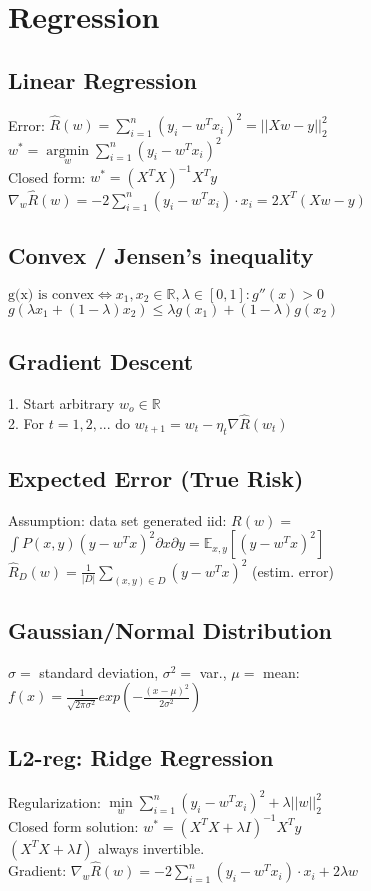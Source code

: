 \section*{Regression}
\subsection*{Linear Regression}
Error: $\hat{R}(w) = \sum_{i=1}^n (y_i - w^Tx_i)^2 = ||Xw-y||^2_2$\\
$w^* = \underset{w}{\operatorname{argmin}} \sum_{i=1}^n (y_i - w^Tx_i)^2$\\
Closed form: $w^*=(X^T X)^{-1} X^T y$\\
$\nabla_w \hat{R}(w) = -2 \sum_{i=1}^n (y_i-w^T x_i) \cdot x_i = 2X^T (Xw-y)$

\subsection*{Convex / Jensen's inequality}
$\text{g(x) is convex} \Leftrightarrow x_1,x_2 \in \mathbb{R}, \lambda \in [0,1]: g''(x) > 0$\\
$g(\lambda x_1 + (1-\lambda) x_2) \leq \lambda g(x_1) + (1-\lambda) g(x_2)$

\subsection*{Gradient Descent}
1. Start arbitrary $w_o \in \mathbb{R}$\\
2. For $t = 1,2,...$ do $w_{t+1} = w_t - \eta_t \nabla \hat{R}(w_t)$

\subsection*{Expected Error (True Risk)}
Assumption: data set generated iid: $R(w) =$\\ 
$\int P(x,y) (y-w^Tx)^2 \partial x \partial y = \mathbb{E}_{x,y}[(y-w^Tx)^2]$\\
$\hat{R}_D(w) = \frac{1}{|D|}\sum_{(x,y)\in D} {(y-w^Tx)^2}$ (estim. error)

\subsection*{Gaussian/Normal Distribution}
$\sigma =$ standard deviation, $\sigma^2 =$ var., $\mu =$ mean:\\
$f(x) = \frac{1}{\sqrt{2\pi\sigma^2}} exp(-\frac{(x-\mu)^2}{2\sigma^2})$

\subsection*{L2-reg: Ridge Regression}
Regularization: $\underset{w}{\operatorname{min}} \sum \limits_{i=1}^n (y_i - w^Tx_i)^2 + \lambda ||w||_2^2$\\
Closed form solution: $w^*=(X^T X + \lambda I)^{-1} X^T y$\\
$(X^T X + \lambda I)$ always invertible.\\
Gradient: $\nabla_w \hat{R}(w) = -2 \sum \limits_{i=1}^n (y_i-w^T x_i) \cdot x_i + 2 \lambda w$

